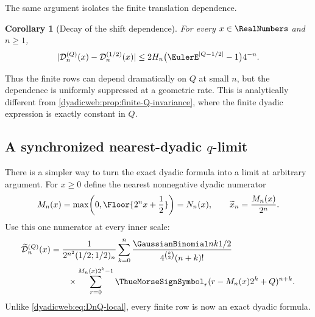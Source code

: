 \documentclass[11pt,oneside]{article}
\newtheorem{corollary}[corollary]{Corollary}
\theoremstyle{definition}
\theoremstyle{remark}
\begin{document}
The same argument isolates the finite translation dependence.

\begin{corollary}[Decay of the shift dependence]
\label{dyadicweb:cor:D-Q-decay}
For every $x\in\RealNumbers$ and $n\ge1$,
\begin{equation}
 |\mathcal D_n^{(Q)}(x)-\mathcal D_n^{(1/2)}(x)|
 \le2H_n\bigl(\EulerE^{|Q-1/2|}-1\bigr)4^{-n}.                \label{dyadicweb:eq:D-Q-decay}
\end{equation}
\end{corollary}

Thus the finite rows can depend dramatically on $Q$ at small $n$, but the dependence is
uniformly suppressed at a geometric rate.  This is analytically different from
\cref{dyadicweb:prop:finite-Q-invariance}, where the finite dyadic expression is exactly constant in
$Q$.

\subsection[A synchronized nearest-dyadic q-limit]{A synchronized nearest-dyadic $q$-limit}
\label{dyadicweb:subsec:synchronized}

There is a simpler way to turn the exact dyadic formula into a limit at arbitrary argument.
For $x\ge0$ define the nearest nonnegative dyadic numerator
\begin{equation}
 M_n(x)=\max\!\left(0,\Floor{2^nx+\frac12}\right)=N_n(x),
 \qquad
 \widetilde x_n=\frac{M_n(x)}{2^n}.                        \label{dyadicweb:eq:nearest-dyadic}
\end{equation}
Use this one numerator at every inner scale:
\begin{align}
 \widetilde{\mathcal D}_n^{(Q)}(x)
 &=\frac1{2^{n^2}(1/2;1/2)_n}
 \sum_{k=0}^{n}
 \frac{\GaussianBinomial nk{1/2}}{4^{\binom k2}(n+k)!}             \notag\\
 &\qquad\times
 \sum_{r=0}^{M_n(x)2^k-1}\ThueMorseSignSymbol_r
       (r-M_n(x)2^k+Q)^{n+k}.                             \label{dyadicweb:eq:synchronized-D}
\end{align}
Unlike \eqref{dyadicweb:eq:DnQ-local}, every finite row is now an exact dyadic formula.
\end{document}
